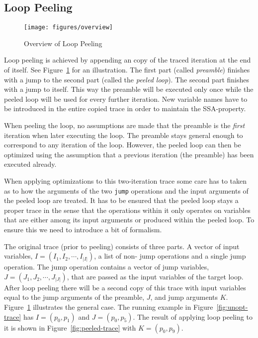 \documentclass[preprint]{sigplanconf}
\begin{document}
\subsection{Loop Peeling}

\begin{figure}
\begin{center}
\texttt{[image: figures/overview]}
\end{center}
\caption{Overview of Loop Peeling}
\label{fig:overview}
\end{figure}

Loop peeling is achieved by appending an copy of the traced iteration at
the end of itself. See Figure~\ref{fig:overview} for an illustration.
The first part (called \emph{preamble}) finishes with a jump to the second part
(called the \emph{peeled loop}). The second part finishes with a jump to itself. This way
the preamble will be executed only once while the peeled loop will
be used for every further iteration. New variable names have to be
introduced in the entire copied trace in order to maintain the SSA-property.

When peeling the loop, no assumptions are made that the preamble is
the \emph{first} iteration when later executing the loop. The preamble stays
general enough to correspond to any iteration of the loop.
However, the peeled loop can then be optimized using the assumption that a
previous iteration (the preamble) has been executed already.


When applying optimizations to this two-iteration trace
some care has to taken as to how the arguments of the two
\lstinline{jump} operations and the input arguments of the peeled loop are
treated. It has to be ensured that the peeled loop stays a proper
trace in the sense that the operations within it only operates on
variables that are either among its input arguments 
or produced within the peeled loop. To ensure this we need
to introduce a bit of formalism.

The original trace (prior to peeling) consists of three parts.
A vector of input
variables, $I=\left(I_1, I_2, \cdots, I_{|I|}\right)$, a list of non-
jump operations and a single
jump operation. The jump operation contains a vector of jump variables,
$J=\left(J_1, J_2, \cdots, J_{|J|}\right)$, that are passed as the input variables of the target loop. After
loop peeling there will be a second copy of this trace with input
variables equal to the jump arguments of the preamble, $J$, and jump
arguments $K$. 
Figure~\ref{fig:overview} illustrates the general case. The running
example in Figure~\ref{fig:unopt-trace} has  $I = \left( p_0, p_1
\right)$ and $J = \left( p_0, p_5 \right)$. The result of applying
loop peeling to it is shown in Figure~\ref{fig:peeled-trace} with 
$K = \left( p_0, p_9 \right)$. 
\end{document}
